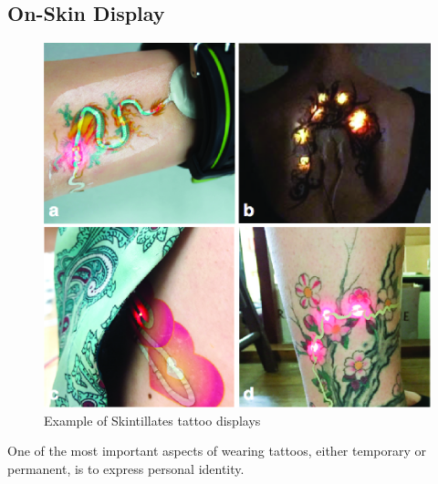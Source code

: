 \documentclass{sigchi}
\begin{document}
\subsection{On-Skin Display}
\begin{figure}[!b]
\centering
\includegraphics[width=1\columnwidth]{figures/Figure6}
\caption{Example of Skintillates tattoo displays}
\vspace{-8pt}
\label{fig:displays}
\end{figure}
One of the most important aspects of wearing tattoos, either temporary or permanent, is to express personal identity. 
\end{document}

